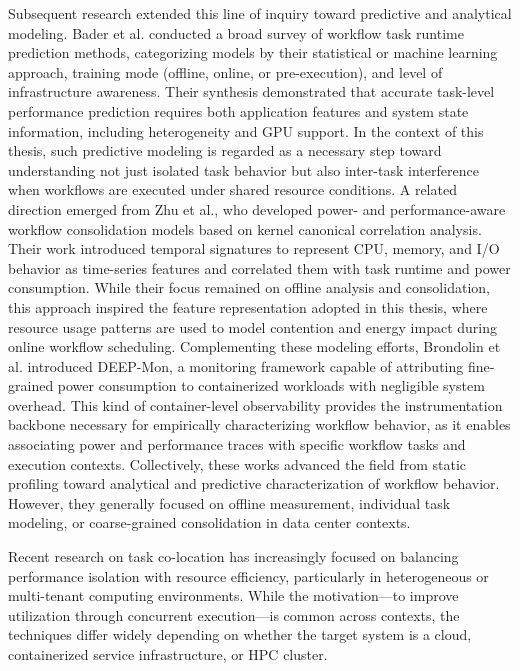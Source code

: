 Subsequent research extended this line of inquiry toward predictive and analytical modeling. Bader et al. conducted a broad survey of workflow task runtime prediction methods, categorizing models by their statistical or machine learning approach, training mode (offline, online, or pre-execution), and level of infrastructure awareness. Their synthesis demonstrated that accurate task-level performance prediction requires both application features and system state information, including heterogeneity and GPU support. In the context of this thesis, such predictive modeling is regarded as a necessary step toward understanding not just isolated task behavior but also inter-task interference when workflows are executed under shared resource conditions.
A related direction emerged from Zhu et al., who developed power- and performance-aware workflow consolidation models based on kernel canonical correlation analysis. Their work introduced temporal signatures to represent CPU, memory, and I/O behavior as time-series features and correlated them with task runtime and power consumption. While their focus remained on offline analysis and consolidation, this approach inspired the feature representation adopted in this thesis, where resource usage patterns are used to model contention and energy impact during online workflow scheduling.
Complementing these modeling efforts, Brondolin et al. introduced DEEP-Mon, a monitoring framework capable of attributing fine-grained power consumption to containerized workloads with negligible system overhead. This kind of container-level observability provides the instrumentation backbone necessary for empirically characterizing workflow behavior, as it enables associating power and performance traces with specific workflow tasks and execution contexts.
Collectively, these works advanced the field from static profiling toward analytical and predictive characterization of workflow behavior. However, they generally focused on offline measurement, individual task modeling, or coarse-grained consolidation in data center contexts.


Recent research on task co-location has increasingly focused on balancing performance isolation with resource efficiency, particularly in heterogeneous or multi-tenant computing environments. While the motivation—to improve utilization through concurrent execution—is common across contexts, the techniques differ widely depending on whether the target system is a cloud, containerized service infrastructure, or HPC cluster.

